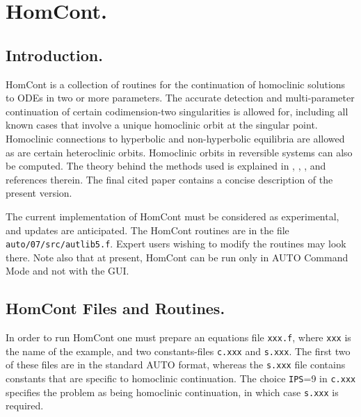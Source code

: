 \documentclass[12pt]{report}
\begin{document}
\chapter{ {\cal HomCont}.} \label{ch:HomCont}
\section{ Introduction.} \label{sec:HomCont_Intro}
{\cal HomCont} is a collection of routines for the continuation 
of homoclinic solutions to ODEs in two or more parameters.
The accurate detection and multi-parameter continuation of certain
codimension-two singularities is allowed for, including all known
cases that involve a unique homoclinic orbit at the singular point.
Homoclinic connections to hyperbolic and non-hyperbolic equilibria are 
allowed as are certain heteroclinic orbits. 
Homoclinic orbits in reversible systems can also be computed.
The theory behind the methods used is
explained in , ,
 \citeyear{Sa:95,Sa:95a},  and
references therein.  The final cited paper contains a concise
description of the present version. 

The current implementation of {\cal HomCont} must be considered as experimental,
and updates are anticipated.
The {\cal HomCont} routines are in the file {\tt auto/07/src/autlib5.f}. 
Expert users wishing to modify the routines may look there.
Note also that at present, {\cal HomCont} can be run only in 
{\cal AUTO} Command Mode and not with the GUI. 


\section{{\cal HomCont} Files and Routines.} \label{sec:HomCont_files}

In order to run {\cal HomCont} one must prepare an equations file {\tt xxx.f}, 
where {\tt xxx} is the name of the example, 
and two constants-files {\tt c.xxx} and {\tt s.xxx}.
The first two of these files are in the standard {\cal AUTO} format, 
whereas the {\tt s.xxx} file
contains constants that are specific to homoclinic continuation.
The choice {\tt IPS}=9 in {\tt c.xxx} specifies the problem as
being homoclinic continuation, in which case {\tt s.xxx} is required.
\end{document}
